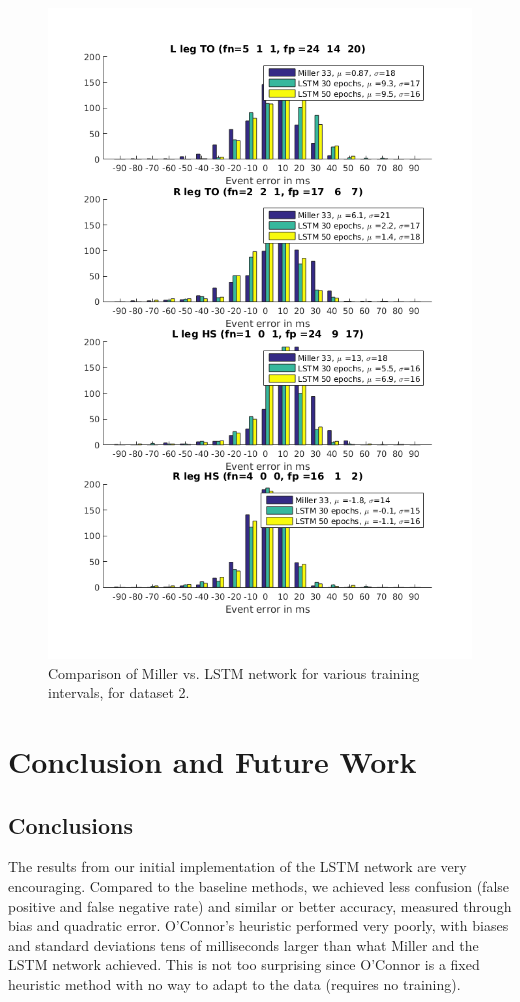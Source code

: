 \documentclass{acm_proc_article-sp}
\begin{document}
\begin{figure}[H]
 \centering
 \includegraphics[scale=.5]{./figures/Test2_1Train2_2Compare.png}
 \caption{Comparison of Miller vs. LSTM network for various training intervals, for dataset 2.}
 \label{fig:halfAndHalfUsers}
\end{figure}

\section{Conclusion and Future Work}
\label{sec:Conclusion and Future Work}
\subsection{Conclusions}
The results from our initial implementation of the LSTM network are very encouraging. Compared to the baseline methods, we achieved less confusion (false positive and false negative rate) and similar or better accuracy, measured through bias and quadratic error. O'Connor's heuristic performed very poorly, with biases and standard deviations tens of milliseconds larger than what Miller and the LSTM network achieved. This is not too surprising since O'Connor is a fixed heuristic method with no way to adapt to the data (requires no training).
\end{document}
